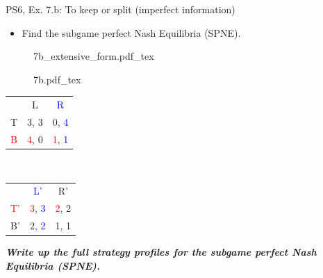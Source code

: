 \begin{frame}{PS6, Ex. 7.b: To keep or split (imperfect information)}
  \begin{itemize}
    \item[(b)] Find the subgame perfect Nash Equilibria (SPNE).
  \end{itemize}
  \vspace{-4pt}
  \begin{figure}[!h]
    \center
    \def\svgwidth{.8\columnwidth}
    {7b_extensive_form.pdf_tex}
  \end{figure}
  \vspace{-2pt}
  \begin{multicols}{2}
    \begin{figure}[!h]
      \center
      \def\svgwidth{.5\columnwidth}
      {7b.pdf_tex}
    \end{figure}
    \vspace{-8pt}
    \begin{table}
      \begin{tabular}{l|c|c|}
        \multicolumn{1}{c}{} & \multicolumn{1}{c}{L} & \multicolumn{1}{c}{\textcolor{blue}{R}} \\\cline{2-3}
        T & 3, 3 & 0, \textcolor{blue}{4} \\\cline{2-3}
        \textcolor{red}{B} & \textcolor{red}{4}, 0 & \textcolor{red}{1}, \textcolor{blue}{1} \\\cline{2-3}
        \end{tabular}\
        \begin{tabular}{l|c|c|}
          \multicolumn{1}{c}{} & \multicolumn{1}{c}{\textcolor{blue}{L'}} & \multicolumn{1}{c}{R'} \\\cline{2-3}
          \textcolor{red}{T'} & \textcolor{red}{3}, \textcolor{blue}{3} & \textcolor{red}{2}, 2 \\\cline{2-3}
          B' & 2, \textcolor{blue}{2} & 1, 1 \\\cline{2-3}
        \end{tabular}
    \end{table}
  \vfill\null\columnbreak
  \vfill\null
  \textbf{\textit{Write up the full strategy profiles for the subgame perfect Nash Equilibria (SPNE).}}
  \end{multicols}
\end{frame}
